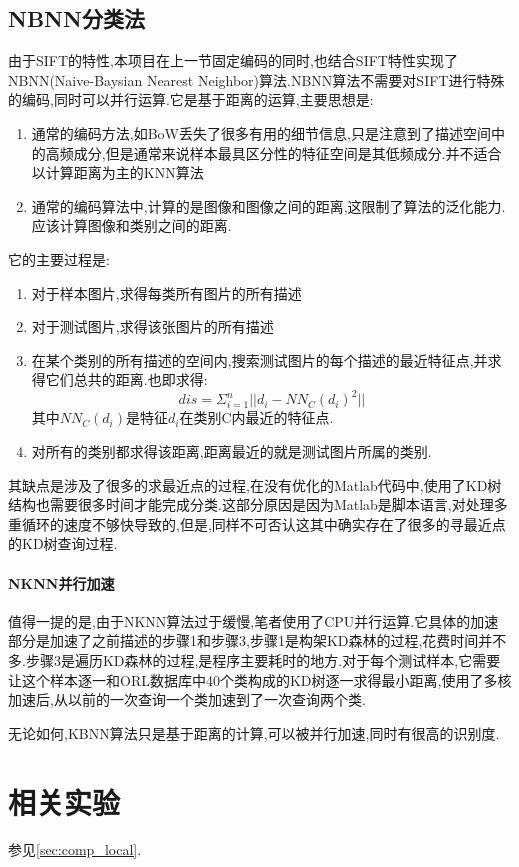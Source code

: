 \subsection{NBNN分类法}
由于SIFT的特性,本项目在上一节固定编码的同时,也结合SIFT特性实现了NBNN(Naive-Baysian Nearest Neighbor)算法\cite{boiman2008defense}.NBNN算法不需要对SIFT进行特殊的编码,同时可以并行运算.它是基于距离的运算,主要思想是:
	\begin{enumerate}
		\item 通常的编码方法,如BoW丢失了很多有用的细节信息,只是注意到了描述空间中的高频成分,但是通常来说样本最具区分性的特征空间是其低频成分.并不适合以计算距离为主的KNN算法
		\item 通常的编码算法中,计算的是图像和图像之间的距离,这限制了算法的泛化能力.应该计算图像和类别之间的距离.
	\end{enumerate}
	它的主要过程是:
	\begin{enumerate}
		\item 对于样本图片,求得每类所有图片的所有描述
		\item 对于测试图片,求得该张图片的所有描述
		\item 在某个类别的所有描述的空间内,搜索测试图片的每个描述的最近特征点,并求得它们总共的距离.也即求得:
			\begin{equation}
				dis = \Sigma_{i=1}^n  || d_i - NN_C(d_i)^2||
			\end{equation}
			其中$NN_C(d_i)$是特征$d_i$在类别C内最近的特征点.
			
		\item 对所有的类别都求得该距离,距离最近的就是测试图片所属的类别.
	\end{enumerate}

其缺点是涉及了很多的求最近点的过程,在没有优化的Matlab代码中,使用了KD树结构也需要很多时间才能完成分类.这部分原因是因为Matlab是脚本语言,对处理多重循环的速度不够快导致的,但是,同样不可否认这其中确实存在了很多的寻最近点的KD树查询过程.

\paragraph{NKNN并行加速}
值得一提的是,由于NKNN算法过于缓慢,笔者使用了CPU并行运算.它具体的加速部分是加速了之前描述的步骤1和步骤3,步骤1是构架KD森林的过程,花费时间并不多.步骤3是遍历KD森林的过程,是程序主要耗时的地方.对于每个测试样本,它需要让这个样本逐一和ORL数据库中40个类构成的KD树逐一求得最小距离,使用了多核加速后,从以前的一次查询一个类加速到了一次查询两个类.\newline


无论如何,KBNN算法只是基于距离的计算,可以被并行加速,同时有很高的识别度.

\section{相关实验}
参见\ref{sec:comp_local}.
